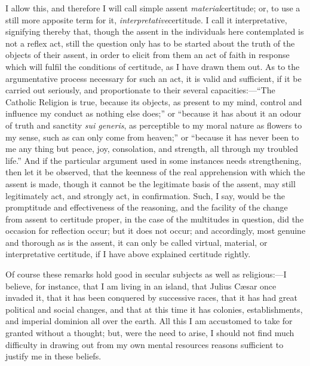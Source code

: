 I allow this, and therefore I will call simple assent \emph{material}certitude;
or, to use a still more apposite term for it, \emph{interpretative}certitude.
I call it interpretative, signifying thereby that, though the assent
in the individuals here contemplated is not a reflex act, still the
question only has to be started about the truth of the objects of
their assent, in order to elicit from them an act of faith in
response which will fulfil the conditions of certitude, as I have
drawn them out. As to the argumentative process necessary for such an
act, it is valid and sufficient, if it be carried out seriously, and
proportionate to their several capacities:—``The Catholic
Religion is true, because its objects, as present to my mind, control
and influence my conduct as nothing else does;'' or ``because
it has about it an odour of truth and sanctity \emph{sui generis}, as
perceptible to my moral nature as flowers to my sense, such as can
only come from heaven;'' or ``because it has never been to me
any thing but peace, joy, consolation, and strength, all through my
troubled life.'' And if the particular argument used in some
instances needs strengthening, then let it be observed, that the
keenness of the real apprehension with which the assent is made,
though it cannot be the legitimate basis of the assent, may still
legitimately act, and strongly act, in confirmation. Such, I say,
would be the promptitude and effectiveness of the reasoning, and the
facility of the change from assent to certitude proper, in the case of
the multitudes in question, did the occasion for reflection occur; but
it does not occur; and accordingly, most genuine and thorough as is
the assent, it can only be called virtual, material, or interpretative
certitude, if I have above explained certitude rightly.

Of course these remarks hold good in secular subjects as well as
religious:—I believe, for instance, that I am living in an island,
that Julius Cæsar once invaded it, that it has been conquered by
successive races, that it has had great political and social changes,
and that at this time it has colonies, establishments, and
imperial dominion all over the earth. All this I am accustomed to take
for granted without a thought; but, were the need to arise, I should
not find much difficulty in drawing out from my own mental resources
reasons sufficient to justify me in these beliefs.

